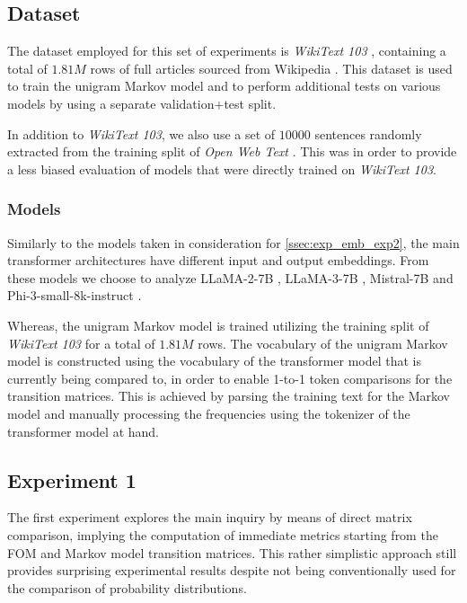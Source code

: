 
\subsection{Dataset}\label{ssec:exp_fom_dataset}

The dataset employed for this set of experiments is \emph{WikiText 103} , containing a total of $1.81M$ rows of full articles sourced from Wikipedia .
This dataset is used to train the unigram Markov model and to perform additional tests on various models by using a separate validation+test split.

In addition to \emph{WikiText 103}, we also use a set of $10000$ sentences randomly extracted from the training split of \emph{Open Web Text} .
This was  in order to provide a less biased evaluation of models that were directly trained on \emph{WikiText 103}.

\subsubsection{Models}

Similarly to the models taken in consideration for \cref{ssec:exp_emb_exp2}, the main  transformer architectures have different input and output embeddings.
From these models we choose to analyze LLaMA-2-7B , LLaMA-3-7B , Mistral-7B  and Phi-3-small-8k-instruct .

Whereas, the unigram Markov model is trained utilizing the training split of \emph{WikiText 103} for a total of $1.81M$ rows.
The vocabulary of the unigram Markov model is constructed using the vocabulary of the transformer model that is currently being compared to, in order to enable 1-to-1 token comparisons for the transition matrices.
This is achieved by parsing the training text for the Markov model and manually processing the frequencies using the tokenizer of the transformer model at hand.

\subsection{Experiment 1}

The first experiment explores the main inquiry by means of direct matrix comparison, implying the computation of immediate metrics starting from the FOM and Markov model transition matrices.
This rather simplistic approach still provides surprising experimental results despite not being conventionally used for the comparison of probability distributions.

